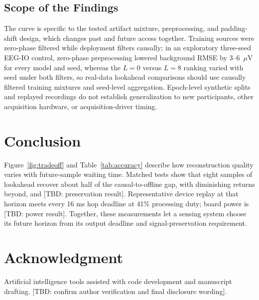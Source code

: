 \documentclass[letterpaper,journal]{IEEEtran}
\newcommand{\TBD}[1]{\textcolor{blue!65!black}{\textnormal{[TBD: #1]}}}
\begin{document}
\subsection{Scope of the Findings}
The curve is specific to the tested artifact mixture, preprocessing, and padding-shift design, which changes past and future access together. Training sources were zero-phase filtered while deployment filters causally; in an exploratory three-seed EEG-IO control, zero-phase preprocessing lowered background RMSE by 3--6~$\mu$V for every model and seed, whereas the $L=0$ versus $L=8$ ranking varied with seed under both filters, so real-data lookahead comparisons should use causally filtered training mixtures and seed-level aggregation.
Epoch-level synthetic splits and replayed recordings do not establish generalization to new participants, other acquisition hardware, or acquisition-driver timing.

\section{Conclusion}
Figure~\ref{fig:tradeoff} and Table~\ref{tab:accuracy} describe how reconstruction quality varies with future-sample waiting time. Matched tests show that eight samples of lookahead recover about half of the causal-to-offline gap, with diminishing returns beyond, and \TBD{preservation result}. Representative device replay at that horizon meets every 16 ms hop deadline at 41\% processing duty; board power is \TBD{power result}. Together, these measurements let a sensing system choose its future horizon from its output deadline and signal-preservation requirement.

\section*{Acknowledgment}
Artificial intelligence tools assisted with code development and manuscript drafting. \TBD{confirm author verification and final disclosure wording}.

\newpage


\end{document}

